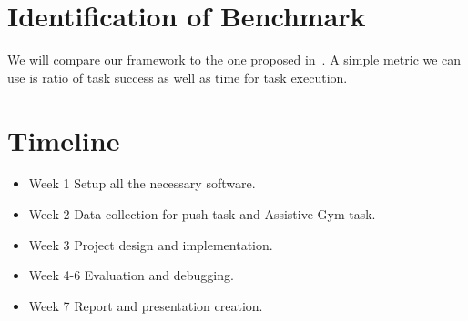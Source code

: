 
\section{Identification of Benchmark}

We will compare our framework to the one proposed in~\cite{Rana20corl}. A simple metric we can use is ratio of task success as well as time for task execution.


\section{Timeline}
\begin{itemize}
    \item Week 1 Setup all the necessary software.
    \item Week 2 Data collection for push task and Assistive Gym task.
    \item Week 3 Project design and implementation.
    \item Week 4-6 Evaluation and debugging.
    \item Week 7 Report and presentation creation.
\end{itemize}
